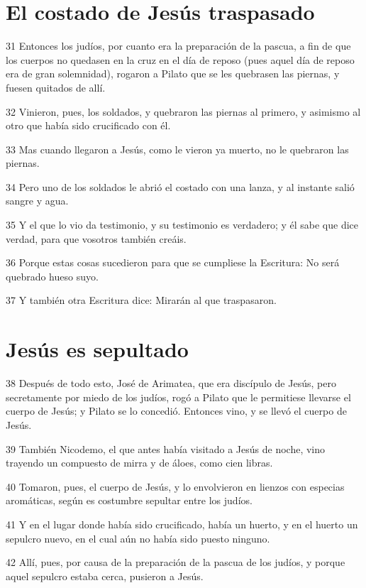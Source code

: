 \section*{El costado de Jesús traspasado}

\par 31 Entonces los judíos, por cuanto era la preparación de la pascua, a fin de que los cuerpos no quedasen en la cruz en el día de reposo (pues aquel día de reposo era de gran solemnidad), rogaron a Pilato que se les quebrasen las piernas, y fuesen quitados de allí.
\par 32 Vinieron, pues, los soldados, y quebraron las piernas al primero, y asimismo al otro que había sido crucificado con él.
\par 33 Mas cuando llegaron a Jesús, como le vieron ya muerto, no le quebraron las piernas.
\par 34 Pero uno de los soldados le abrió el costado con una lanza, y al instante salió sangre y agua.
\par 35 Y el que lo vio da testimonio, y su testimonio es verdadero; y él sabe que dice verdad, para que vosotros también creáis.
\par 36 Porque estas cosas sucedieron para que se cumpliese la Escritura: No será quebrado hueso suyo.
\par 37 Y también otra Escritura dice: Mirarán al que traspasaron.

\section*{Jesús es sepultado}

\par 38 Después de todo esto, José de Arimatea, que era discípulo de Jesús, pero secretamente por miedo de los judíos, rogó a Pilato que le permitiese llevarse el cuerpo de Jesús; y Pilato se lo concedió. Entonces vino, y se llevó el cuerpo de Jesús.
\par 39 También Nicodemo, el que antes había visitado a Jesús de noche, vino trayendo un compuesto de mirra y de áloes, como cien libras.
\par 40 Tomaron, pues, el cuerpo de Jesús, y lo envolvieron en lienzos con especias aromáticas, según es costumbre sepultar entre los judíos.
\par 41 Y en el lugar donde había sido crucificado, había un huerto, y en el huerto un sepulcro nuevo, en el cual aún no había sido puesto ninguno.
\par 42 Allí, pues, por causa de la preparación de la pascua de los judíos, y porque aquel sepulcro estaba cerca, pusieron a Jesús.

